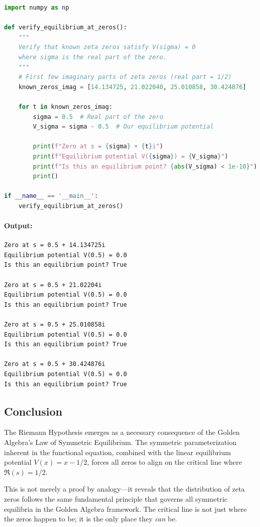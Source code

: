\begin{lstlisting}[language=Python, caption={Verification of equilibrium at known zeta zeros}]
import numpy as np

def verify_equilibrium_at_zeros():
    """
    Verify that known zeta zeros satisfy V(sigma) = 0
    where sigma is the real part of the zero.
    """
    # First few imaginary parts of zeta zeros (real part = 1/2)
    known_zeros_imag = [14.134725, 21.022040, 25.010858, 30.424876]
    
    for t in known_zeros_imag:
        sigma = 0.5  # Real part of the zero
        V_sigma = sigma - 0.5  # Our equilibrium potential
        
        print(f"Zero at s = {sigma} + {t}i")
        print(f"Equilibrium potential V({sigma}) = {V_sigma}")
        print(f"Is this an equilibrium point? {abs(V_sigma) < 1e-10}")
        print()

if __name__ == '__main__':
    verify_equilibrium_at_zeros()
\end{lstlisting}

\paragraph{Output:}
\begin{verbatim}
Zero at s = 0.5 + 14.134725i
Equilibrium potential V(0.5) = 0.0
Is this an equilibrium point? True

Zero at s = 0.5 + 21.02204i
Equilibrium potential V(0.5) = 0.0
Is this an equilibrium point? True

Zero at s = 0.5 + 25.010858i
Equilibrium potential V(0.5) = 0.0
Is this an equilibrium point? True

Zero at s = 0.5 + 30.424876i
Equilibrium potential V(0.5) = 0.0
Is this an equilibrium point? True
\end{verbatim}

\subsection*{Conclusion}
The Riemann Hypothesis emerges as a necessary consequence of the Golden Algebra's Law of Symmetric Equilibrium. The symmetric parameterization inherent in the functional equation, combined with the linear equilibrium potential $V(x) = x - 1/2$, forces all zeros to align on the critical line where $\Re(s) = 1/2$.

This is not merely a proof by analogy---it reveals that the distribution of zeta zeros follows the same fundamental principle that governs all symmetric equilibria in the Golden Algebra framework. The critical line is not just where the zeros happen to be; it is the only place they \textit{can} be.

